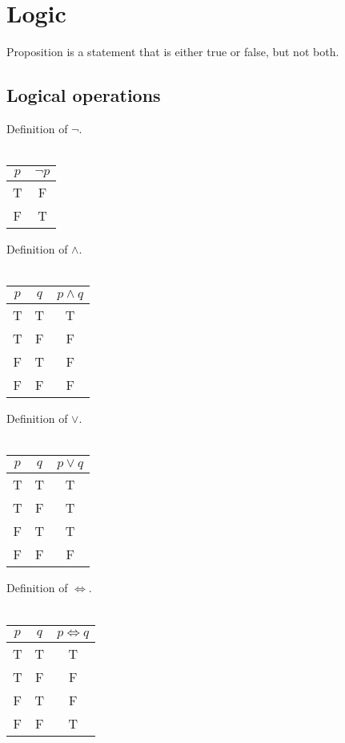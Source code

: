 \chapter{Logic}
\begin{defn}
Proposition is a statement that is either true or false, but not both.
\end{defn}

\section{Logical operations}

\begin{defn}
Definition of $\lnot$. \\ \\
\begin{tabular}{|c|c|}
\hline
$p$ & $\lnot p$  \\
\hline
T & F \\
\hline
F & T \\
\hline
\end{tabular}
\end{defn}

\begin{defn}
Definition of $\land$. \\ \\
\begin{tabular}{|c|c|c|}
\hline
$p$ & $q$ & $p \land q$ \\
\hline
T & T & T \\
\hline
T & F & F \\
\hline
F & T & F \\
\hline
F & F & F \\
\hline
\end{tabular}
\end{defn}

\begin{defn}
Definition of $\lor$. \\ \\
\begin{tabular}{|c|c|c|}
\hline
$p$ & $q$ & $p \lor q$ \\
\hline
T & T & T \\
\hline
T & F & T \\
\hline
F & T & T \\
\hline
F & F & F \\
\hline
\end{tabular}
\end{defn}

\begin{defn}
Definition of $\iff$. \\ \\
\begin{tabular}{|c|c|c|}
\hline
$p$ & $q$ & $p \iff q$ \\
\hline
T & T & T \\
\hline
T & F & F \\
\hline
F & T & F \\
\hline
F & F & T \\
\hline
\end{tabular}
\end{defn}

